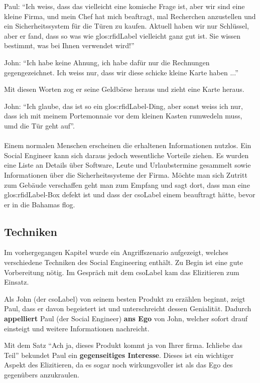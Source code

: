 Paul: "`Ich weiss, dass das vielleicht eine komische Frage ist, aber wir sind eine kleine Firma, und mein Chef hat mich beaftragt, mal Recherchen anzustellen und ein Sicherheitssystem für die Türen zu kaufen. Aktuell haben wir nur Schlüssel, aber er fand, dass so was wie \gls{glos:rfidLabel} vielleicht ganz gut ist. Sie wissen bestimmt, was bei Ihnen verwendet wird!"'

John: "`Ich habe keine Ahnung, ich habe dafür nur die Rechnungen gegengezeichnet. Ich weiss nur, dass wir diese schicke kleine Karte haben ..."'

Mit diesen Worten zog er seine Geldbörse heraus und zieht eine Karte heraus.

John: "`Ich glaube, das ist so ein \gls{glos:rfidLabel}-Ding, aber sonst weiss ich nur, dass ich mit meinem Portemonnaie vor dem kleinen Kasten rumwedeln muss, umd die Tür geht auf"'.
\\
\\
Einem normalen Menschen erscheinen die erhaltenen Informationen nutzlos. Ein Social Engineer kann sich daraus jedoch wesentliche Vorteile ziehen. Es wurden eine Liste an Details über Software, Leute und Urlaubstermine gesammelt sowie Informationen über die Sicherheitssysteme der Firma.
Möchte man sich Zutritt zum Gebäude verschaffen geht man zum Empfang und sagt dort, dass man eine \gls{glos:rfidLabel}-Box defekt ist und dass der \Gls{csoLabel} einem beauftragt hätte, bevor er in die Bahamas flog.

\subsection{Techniken}
Im vorhergegangen Kapitel wurde ein Angriffszenario aufgezeigt, welches verschiedene Techniken des Social Engineering enthält. Zu Begin ist eine gute Vorbereitung nötig. Im Gespräch mit dem \Gls{csoLabel} kam das Elizitieren zum Einsatz. 

Als John (der \Gls{csoLabel}) von seinem besten Produkt zu erzählen beginnt, zeigt Paul, dass er davon begeistert ist und unterschreicht dessen Genialität. Dadurch \textbf{appelliert} Paul (der Social Engineer) \textbf{ans Ego} von John, welcher sofort drauf einsteigt und weitere Informationen nachreicht.

Mit dem Satz "`Ach ja, dieses Produkt kommt ja von Ihrer firma. Ichliebe das Teil"' bekundet Paul ein \textbf{gegenseitiges Interesse}. Dieses ist ein wichtiger Aspekt des Elizitieren, da es sogar noch wirkungsvoller ist als das Ego des gegenübers anzukraulen.

